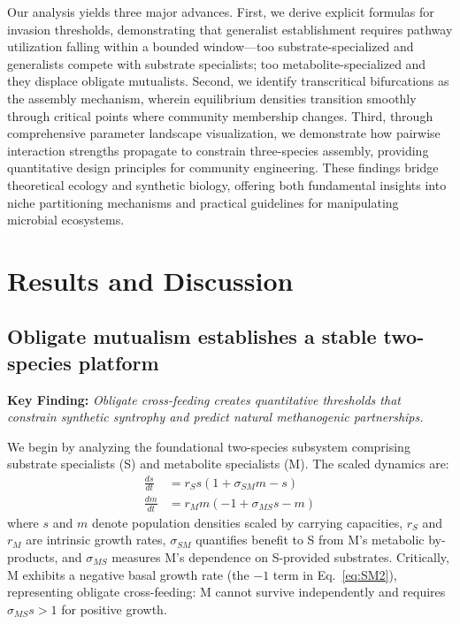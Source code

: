 \documentclass[9pt,twocolumn]{pnas-new}
\begin{document}
Our analysis yields three major advances. First, we derive explicit formulas for invasion thresholds, demonstrating that generalist establishment requires pathway utilization falling within a bounded window—too substrate-specialized and generalists compete with substrate specialists; too metabolite-specialized and they displace obligate mutualists. Second, we identify transcritical bifurcations as the assembly mechanism, wherein equilibrium densities transition smoothly through critical points where community membership changes. Third, through comprehensive parameter landscape visualization, we demonstrate how pairwise interaction strengths propagate to constrain three-species assembly, providing quantitative design principles for community engineering. These findings bridge theoretical ecology and synthetic biology, offering both fundamental insights into niche partitioning mechanisms and practical guidelines for manipulating microbial ecosystems.

\section*{Results and Discussion}

\subsection*{Obligate mutualism establishes a stable two-species platform}

\textbf{Key Finding:} \textit{Obligate cross-feeding creates quantitative thresholds that constrain synthetic syntrophy and predict natural methanogenic partnerships.}

We begin by analyzing the foundational two-species subsystem comprising substrate specialists (S) and metabolite specialists (M). The scaled dynamics are:
\begin{align}
\frac{ds}{dt} &= r_S s(1 + \sigma_{SM} m - s) \label{eq:SM1}\\
\frac{dm}{dt} &= r_M m(-1 + \sigma_{MS} s - m) \label{eq:SM2}
\end{align}
where $s$ and $m$ denote population densities scaled by carrying capacities, $r_S$ and $r_M$ are intrinsic growth rates, $\sigma_{SM}$ quantifies benefit to S from M's metabolic by-products, and $\sigma_{MS}$ measures M's dependence on S-provided substrates. Critically, M exhibits a negative basal growth rate (the $-1$ term in Eq.~\ref{eq:SM2}), representing obligate cross-feeding: M cannot survive independently and requires $\sigma_{MS} s > 1$ for positive growth.
\end{document}
